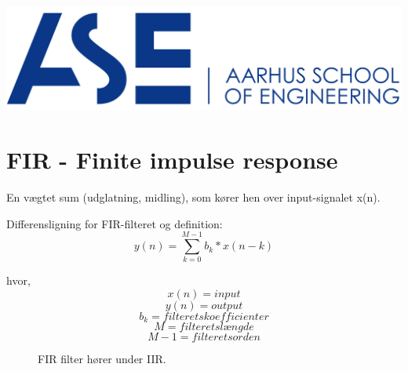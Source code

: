 \documentclass[12pt, letterpaper]{article}
\begin{document}
\begin{titlepage}

\includegraphics[scale=0.5]{billeder/au}\\ %
 

\vfill %


\end{titlepage}

\tableofcontents
\newpage

\newpage

\section{FIR - Finite impulse response}

En vægtet sum (udglatning, midling), som kører hen over input-signalet x(n). 

Differensligning for FIR-filteret og definition: 
$$ y(n)= \sum\limits_{k=0}^{M-1} b_k * x(n-k)$$

hvor, 
$$ x(n) = input $$
$$ y(n) = output $$
$$ b_k = filterets koefficienter $$ 
$$ M = filterets længde $$
$$ M-1 = filterets orden $$

\begin{figure}[!h]
           \begin{floatrow}
             		   			{\caption{FIR filter hører under IIR.}}
           \end{floatrow}
\end{figure}
\end{document}
